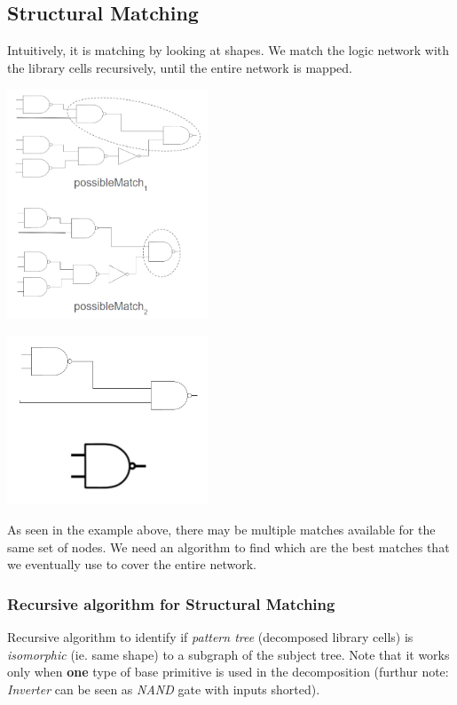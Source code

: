 \documentclass{article}
\begin{document}
\subsection{Structural Matching}
Intuitively, it is matching by looking at shapes.
We match the logic network with the library cells recursively, until the entire network is mapped.

\begin{minipage}[t]{0.5\textwidth}
    \centering
    \includegraphics[width=6cm, scale=1]{S4/possibleMatches.PNG}
    \captionsetup{justification=centering}
\end{minipage}%
\begin{minipage}[t]{0.5\textwidth}
    \centering
    \includegraphics[width=6cm, scale=1]{S4/libraryCells.PNG}
    \captionsetup{justification=centering}
\end{minipage}%

As seen in the example above, there may be multiple matches available for the same set of nodes. 
We need an algorithm to find which are the best matches that we eventually use to cover the entire network.

\subsubsection{Recursive algorithm for Structural Matching}
Recursive algorithm to identify if \textit{pattern tree} (decomposed library cells) is \textit{isomorphic} (ie. same shape) to a subgraph of the subject tree.
Note that it works only when \textbf{one} type of base primitive is used in the decomposition (furthur note: \textit{Inverter} can be seen as \textit{NAND} gate with inputs shorted).
\end{document}

